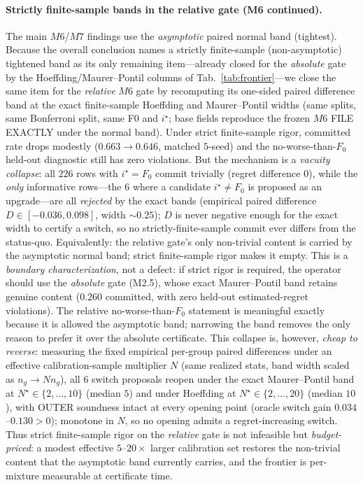 \documentclass{article}
\begin{document}
\paragraph{Strictly finite-sample bands in the relative gate (M6 continued).}
The main $M6$/$M7$ findings use the \emph{asymptotic} paired normal band (tightest).
Because the overall conclusion names a strictly finite-sample (non-asymptotic) tightened
band as its only remaining item---already closed for the \emph{absolute} gate by the
Hoeffding/Maurer--Pontil columns of Tab.~\ref{tab:frontier}---we close the same item for the
\emph{relative} $M6$ gate by recomputing its one-sided paired difference band at the exact
finite-sample Hoeffding and Maurer--Pontil widths (same splits, same Bonferroni split,
same F0 and $i^\star$; base fields reproduce the frozen $M6$ FILE EXACTLY under the normal
band). Under strict finite-sample rigor, committed rate drops modestly
($0.663\to0.646$, matched $5$-seed) and the no-worse-than-$F_0$ held-out diagnostic still has
zero violations. But the
mechanism is a \emph{vacuity collapse}: all $226$ rows with $i^\star{=}F_0$ commit trivially
(regret difference $0$), while the \emph{only} informative rows---the $6$ where a candidate
$i^\star\ne F_0$ is proposed as an upgrade---are all \emph{rejected} by the exact bands
(empirical paired difference $D\!\in\![-0.036,0.098]$, width $\sim0.25$); $D$ is never
negative enough for the exact width to certify a switch, so no strictly-finite-sample commit
ever differs from the status-quo. Equivalently: the relative gate's only non-trivial content
is carried by the asymptotic normal band; strict finite-sample rigor makes it empty. This is
a \emph{boundary characterization}, not a defect: if strict rigor is required, the operator
should use the \emph{absolute} gate (M2.5), whose exact Maurer--Pontil band retains genuine
content ($0.260$ committed, with zero held-out estimated-regret violations). The relative
no-worse-than-$F_0$ statement is
meaningful exactly because it is allowed the asymptotic band; narrowing the band removes the
only reason to prefer it over the absolute certificate. This collapse is, however, \emph{cheap
to reverse}: measuring the fixed empirical per-group paired differences under an effective
calibration-sample multiplier $N$ (same realized stats, band width scaled as $n_g\!\to\!N n_g$),
all $6$ switch proposals reopen under the exact Maurer--Pontil band at $N^\star\!\in\!\{2,\dots,
10\}$ (median $5$) and under Hoeffding at $N^\star\!\in\!\{2,\dots,20\}$ (median $10$), with
OUTER soundness intact at every opening point (oracle switch gain $0.034$--$0.130>0$); monotone
in $N$, so no opening admits a regret-increasing switch. Thus strict finite-sample rigor on the
\emph{relative} gate is not infeasible but \emph{budget-priced}: a modest effective
$5$--$20\!\times$ larger calibration set restores the non-trivial content that the asymptotic
band currently carries, and the frontier is per-mixture measurable at certificate time.
\end{document}
